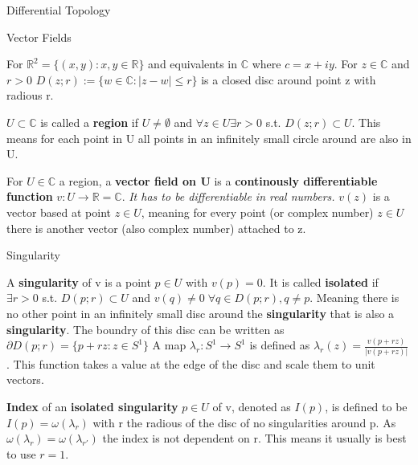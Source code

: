 \documentclass[12pt, letterpaper]{article}
\begin{document}
\begin{section}{Differential Topology}
  \begin{subsection}{Vector Fields}

    For \(\mathbb{R}^{2} = \{ (x, y) : x, y \in \mathbb{R} \}\) and equivalents
    in \(\mathbb{C}\) where \(c = x + iy\). For \(z \in \mathbb{C}\) and \(r > 0\)
    \(D(z; r) := \{ w \in \mathbb{C} : |z - w| \leq r \}\) is a closed disc around
    point z with radious r.

    \(U \subset \mathbb{C}\) is called a \textbf{region} if \(U \neq \emptyset\)
    and \(\forall z \in U \exists r > 0\) s.t. \(D(z; r) \subset U\). This means
    for each point in U all points in an infinitely small circle around are
    also in U.

    For \(U \in \mathbb{C}\) a region, a \textbf{vector field on U} is a
    \textbf{continously differentiable function} \(v: U \to \mathbb{R} = \mathbb{C}\).
    \emph{It has to be differentiable in real numbers.} \(v(z)\) is a vector based
    at point \(z \in U\), meaning for every point (or complex number) \(z \in U\)
    there is another vector (also complex number) attached to z. \\

  \end{subsection}

  \begin{subsection}{Singularity}

    A \textbf{singularity} of v is a point \(p \in U\) with \(v(p) = 0\).
    It is called \textbf{isolated} if \(\exists r > 0\) s.t. \(D(p; r) \subset U\)
    and \(v(q) \neq 0 \; \forall q \in D(p; r), q \neq p\). Meaning there is no other
    point in an infinitely small disc around the \textbf{singularity} that is also
    a \textbf{singularity}.
    The boundry of this disc can be written as \(\partial D(p; r) =
    \{ p + rz : z \in  S^{1} \}\)
    A map \(\lambda_{r} : S^{1} \to S^{1}\) is defined as \(\lambda_{r}(z) =
    \frac{v(p + rz)}{|v(p + rz)|}\). This function takes a value at the edge
    of the disc and scale them to unit vectors.

    \textbf{Index} of an \textbf{isolated singularity} \(p \in U\) of v,
    denoted as \(I(p)\), is defined to be \(I(p) = \omega(\lambda_{r})\) with r
    the radious of the disc of no singularities around p. As \(\omega(\lambda_{r})
    = \omega(\lambda_{r'})\) the index is not dependent on r. This means it usually
    is best to use \(r = 1\).

  \end{subsection}


\end{section}
\end{document}
